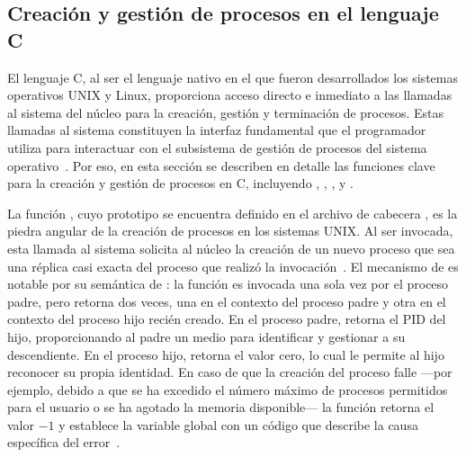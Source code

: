\subsection{Creación y gestión de procesos en el lenguaje C}
\label{subsec:gestion_procesos}

El lenguaje C, al ser el lenguaje nativo en el que fueron desarrollados los sistemas operativos UNIX y Linux, proporciona acceso directo e inmediato a las llamadas al sistema del núcleo para la creación, gestión y terminación de procesos. Estas llamadas al sistema constituyen la interfaz fundamental que el programador utiliza para interactuar con el subsistema de gestión de procesos del sistema operativo~\cite{stevens2013, kerrisk2010}. Por eso, en esta sección se describen en detalle las funciones clave para la creación y gestión de procesos en C, incluyendo , , ,  y .


La función , cuyo prototipo se encuentra definido en el archivo de cabecera , es la piedra angular de la creación de procesos en los sistemas UNIX. Al ser invocada, esta llamada al sistema solicita al núcleo la creación de un nuevo proceso que sea una réplica casi exacta del proceso que realizó la invocación~\cite{stevens2013}. El mecanismo de  es notable por su semántica de : la función es invocada una sola vez por el proceso padre, pero retorna dos veces, una en el contexto del proceso padre y otra en el contexto del proceso hijo recién creado. En el proceso padre,  retorna el PID del hijo, proporcionando al padre un medio para identificar y gestionar a su descendiente. En el proceso hijo,  retorna el valor cero, lo cual le permite al hijo reconocer su propia identidad. En caso de que la creación del proceso falle ---por ejemplo, debido a que se ha excedido el número máximo de procesos permitidos para el usuario o se ha agotado la memoria disponible--- la función retorna el valor $-1$ y establece la variable global  con un código que describe la causa específica del error~\cite{kerrisk2010}.


